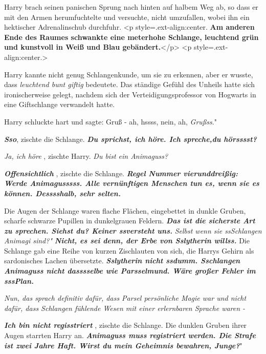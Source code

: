 Harry brach seinen panischen Sprung nach hinten auf halbem Weg ab, so dass er
mit den Armen herumfuchtelte und versuchte, nicht umzufallen, wobei ihn ein
hektischer Adrenalinschub durchfuhr. <p style=\grqq{}.ext-align:center\grqq{}.
\textbf{ Am anderen Ende des Raumes schwankte eine meterhohe Schlange, leuchtend
grün und kunstvoll in Weiß und Blau gebändert.}</p> <p
style=\grqq{}.ext-align:center\grqq{}.>

Harry kannte nicht genug Schlangenkunde, um sie zu erkennen, aber er wusste,
dass \emph{ \glqq leuchtend bunt\grqq{} \glqq giftig\grqq{} } bedeutete. Das
ständige Gefühl des Unheils hatte sich ironischerweise gelegt, nachdem sich der
Verteidigungsprofessor von Hogwarts in eine Giftschlange verwandelt hatte.

Harry schluckte hart und sagte: \glqq Gruß - ah, hssss, nein, ah,
\emph{Grußss}."

\glqq \textbf{\emph{Sso}}\grqq{}, zischte die Schlange. \textbf{\emph{\glqq Du
sprichst, ich höre. Ich spreche,du hörsssst?\grqq{} }}

\emph{ \glqq Ja, ich höre\grqq{} }, zischte Harry. \emph{\glqq Du bist ein
Animaguss?\grqq{} }

\textbf{\emph{ \glqq Offensichtlich\grqq{} }}, zischte die Schlange.
\textbf{\emph{ \glqq Regel Nummer vierunddreißig: Werde Animagusssss. Alle
vernünftigen Menschen tun es, wenn sie es können. Desssshalb, sehr
selten.\grqq{} }}

Die Augen der Schlange waren flache Flächen, eingebettet in dunkle Gruben,
scharfe schwarze Pupillen in dunkelgrauen Feldern. \textbf{\emph{ \glqq Das ist
die sicherste Art zu sprechen. Siehst du? Keiner ssversteht uns.\grqq{} }}
\emph{ \glqq Selbst wenn sie ssSchlangen Animagi sind?" } \textbf{\emph{ \glqq
Nicht, es sei denn, der Erbe von Sslytherin willss.\grqq{} }} Die Schlange gab
eine Reihe von kurzen Zischlauten von sich, die Harrys Gehirn als sardonisches
Lachen übersetzte. \textbf{\emph{ \glqq Sslytherin nicht ssdumm. Sschlangen
Animaguss nicht dasssselbe wie Parsselmund. Wäre großer Fehler im
sssPlan.\grqq{} }}

\emph{ Nun, das sprach definitiv dafür, dass Parsel persönliche Magie war und nicht dafür, dass Schlangen fühlende Wesen mit einer erlernbaren Sprache waren -}

\textbf{\emph{ \glqq Ich bin nicht regisstriert\grqq{} }}, zischte die Schlange.
Die dunklen Gruben ihrer Augen starrten Harry an. \textbf{\emph{ \glqq Animaguss
muss registriert werden. Die Strafe ist zwei Jahre Haft. Wirst du mein Geheimnis
bewahren, Junge?}}"

